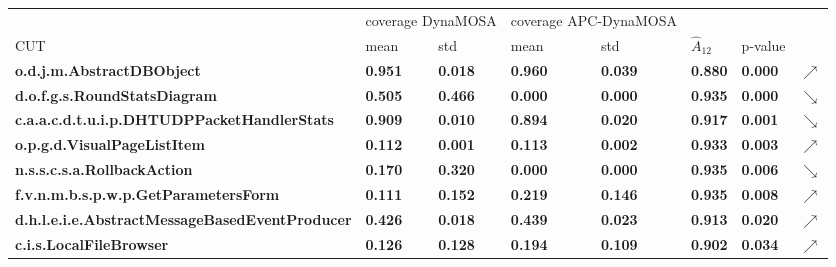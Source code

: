 \begin{tabular}{llllllll}
\hline
\multicolumn{1}{l|}{}                                                       & \multicolumn{2}{l|}{coverage DynaMOSA}               & \multicolumn{2}{l|}{coverage APC-DynaMOSA}                &                &                \\
\multicolumn{1}{l|}{CUT}                                                    & mean           & \multicolumn{1}{l|}{std}            & mean           & \multicolumn{1}{l|}{std}            & $\hat{A}_{12}$ & p-value     &    \\
\hline
\multicolumn{1}{l|}{\textbf{o.d.j.m.AbstractDBObject}}                      & \textbf{0.951} & \multicolumn{1}{l|}{\textbf{0.018}} & \textbf{0.960} & \multicolumn{1}{l|}{\textbf{0.039}} & \textbf{0.880} & \textbf{0.000} & $\nearrow$\\
\multicolumn{1}{l|}{\textbf{d.o.f.g.s.RoundStatsDiagram}}                   & \textbf{0.505} & \multicolumn{1}{l|}{\textbf{0.466}} & \textbf{0.000} & \multicolumn{1}{l|}{\textbf{0.000}} & \textbf{0.935} & \textbf{0.000} & $\searrow$\\
\multicolumn{1}{l|}{\textbf{c.a.a.c.d.t.u.i.p.DHTUDPPacketHandlerStats}}    & \textbf{0.909} & \multicolumn{1}{l|}{\textbf{0.010}} & \textbf{0.894} & \multicolumn{1}{l|}{\textbf{0.020}} & \textbf{0.917} & \textbf{0.001} & $\searrow$\\
\multicolumn{1}{l|}{\textbf{o.p.g.d.VisualPageListItem}}                    & \textbf{0.112} & \multicolumn{1}{l|}{\textbf{0.001}} & \textbf{0.113} & \multicolumn{1}{l|}{\textbf{0.002}} & \textbf{0.933} & \textbf{0.003} & $\nearrow$\\
\multicolumn{1}{l|}{\textbf{n.s.s.c.s.a.RollbackAction}}                    & \textbf{0.170} & \multicolumn{1}{l|}{\textbf{0.320}} & \textbf{0.000} & \multicolumn{1}{l|}{\textbf{0.000}} & \textbf{0.935} & \textbf{0.006} & $\searrow$\\
\multicolumn{1}{l|}{\textbf{f.v.n.m.b.s.p.w.p.GetParametersForm}}           & \textbf{0.111} & \multicolumn{1}{l|}{\textbf{0.152}} & \textbf{0.219} & \multicolumn{1}{l|}{\textbf{0.146}} & \textbf{0.935} & \textbf{0.008} & $\nearrow$\\
\multicolumn{1}{l|}{\textbf{d.h.l.e.i.e.AbstractMessageBasedEventProducer}} & \textbf{0.426} & \multicolumn{1}{l|}{\textbf{0.018}} & \textbf{0.439} & \multicolumn{1}{l|}{\textbf{0.023}} & \textbf{0.913} & \textbf{0.020} & $\nearrow$\\
\multicolumn{1}{l|}{\textbf{c.i.s.LocalFileBrowser}}                        & \textbf{0.126} & \multicolumn{1}{l|}{\textbf{0.128}} & \textbf{0.194} & \multicolumn{1}{l|}{\textbf{0.109}} & \textbf{0.902} & \textbf{0.034} & $\nearrow$\\

\end{tabular}
